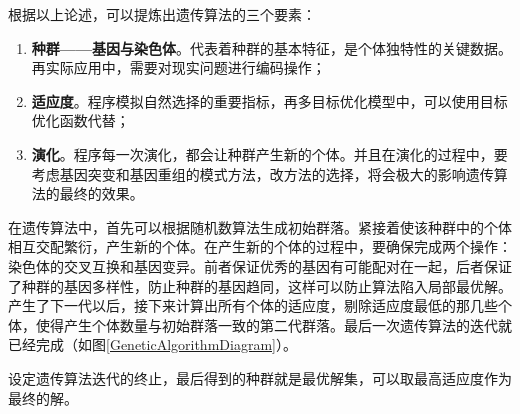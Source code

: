 根据以上论述，可以提炼出遗传算法的三个要素：

\begin{enumerate}
    \item \textbf{种群——基因与染色体}。代表着种群的基本特征，是个体独特性的关键数据。再实际应用中，需要对现实问题进行编码操作；
    \item \textbf{适应度}。程序模拟自然选择的重要指标，再多目标优化模型中，可以使用目标优化函数代替；
    \item \textbf{演化}。程序每一次演化，都会让种群产生新的个体。并且在演化的过程中，要考虑基因突变和基因重组的模式方法，改方法的选择，将会极大的影响遗传算法的最终的效果。
\end{enumerate}

在遗传算法中，首先可以根据随机数算法生成初始群落。紧接着使该种群中的个体相互交配繁衍，产生新的个体。在产生新的个体的过程中，要确保完成两个操作：染色体的交叉互换和基因变异。前者保证优秀的基因有可能配对在一起，后者保证了种群的基因多样性，防止种群的基因趋同，这样可以防止算法陷入局部最优解。产生了下一代以后，接下来计算出所有个体的适应度，剔除适应度最低的那几些个体，使得产生个体数量与初始群落一致的第二代群落。最后一次遗传算法的迭代就已经完成（如图\ref{GeneticAlgorithmDiagram}）。

设定遗传算法迭代的终止，最后得到的种群就是最优解集，可以取最高适应度作为最终的解。

